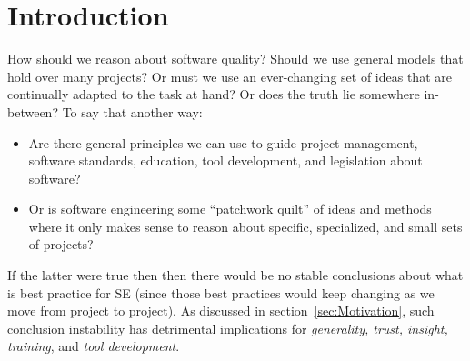 \documentclass[10pt,journal,compsoc]{IEEEtran}
\newcommand{\bi}{\begin{itemize}}
\newcommand{\ei}{\end{itemize}}
\begin{document}
\maketitle

\IEEEdisplaynontitleabstractindextext
\IEEEdisplaynontitleabstractindextext


\ifCLASSOPTIONcaptionsoff
 \newpage
\fi

\section{Introduction}



How should we reason about software quality?  Should we use  general models that hold over many projects? Or must we use an ever-changing set of ideas that are   continually adapted to the task at hand? 
Or does the truth lie somewhere in-between?  
To say that another way:
\bi
\item
Are there general principles we can use to guide project management, software standards, education,   tool development, and legislation about software? 
\item
Or is  software engineering some ``patchwork quilt'' of ideas and methods where it only makes sense to reason about specific, specialized, and small sets of  projects?
\ei
If the latter were true then
 then there would be no stable conclusions about what is best practice for SE   (since those best practices would keep changing as we move from project to project). As discussed in section~\ref{sec:Motivation}, such conclusion instability has   detrimental implications for {\em generality, trust, insight, training}, and {\em tool development}.

\end{document}
